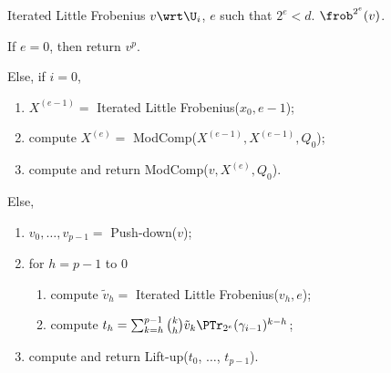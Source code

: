 \begin{figure}[!htb]
  \begin{algorithm}
    {Iterated Little Frobenius}
    {$v\wrt\U_i$, $e$ such that $2^e<d$.}
    {$\frob^{2^e}(v)$.}
  \item \label{alg:l-frob:base-n} If $e = 0$, then return $v^p$.
  \item \label{alg:l-frob:modcomp} Else, if $i=0$,
    \begin{enumerate}
    \item \label{alg:l-frob:rec1} $X^{(e-1)}=$ Iterated Little Frobenius($x_0, e-1$);
    \item \label{alg:l-frob:e}compute $X^{(e)}=$ ModComp($X^{(e-1)},X^{(e-1)},Q_0$);
    \item \label{alg:l-frob:v-e} compute and return
      ModComp($v,X^{(e)},Q_0$).
    \end{enumerate}
  \item \label{alg:l-frob:i}Else,
    \begin{enumerate}
    \item \label{alg:l-frob:push} $v_0, \ldots, v_{p-1} = $
      Push-down($v$);
    \item \label{alg:l-frob:for} for $h = p-1$ to $0$
      \begin{enumerate}
      \item \label{alg:l-frob:rec} compute $\tilde{v}_h = $ Iterated
	Little Frobenius($v_h, e$);
      \item \label{alg:l-frob:comp} compute $t_h = \sum_{k=h}^{p-1}
	\binom{k}{h}\tilde{v}_k\PTr_{2^e}(\gamma_{i-1})^{k-h}$;
      \end{enumerate}
    \item \label{alg:l-frob:lift} compute and return Lift-up($t_0$,
    $\ldots$, $t_{p-1}$).
    \end{enumerate}
  \end{algorithm}
\end{figure}

